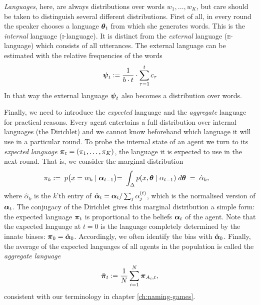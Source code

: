 \documentclass{../src/bcthesispart}
\begin{document}
\emph{Languages}, here, are always distributions over words $w_1, \dots, w_K$, but care should be taken to distinguish several different distributions.
First of all, in every round the speaker chooses a language $\boldsymbol{\mathbf{\theta}}_t$ from which she generates words.
This is the \emph{internal} language (\textsc{i}-language).
It is distinct from the \emph{external} language (\textsc{e}-language) which consists of all utterances.
The external language can be estimated with the relative frequencies of the words
\begin{equation}
	\boldsymbol{\mathbf{\psi}}_t := \frac{1}{b\cdot t}\cdot\sum_{\tau=1}^t c_\tau
\end{equation}
In that way the external language $\boldsymbol{\mathbf{\psi}}_t$ also becomes a distribution over words.




Finally, we need to introduce the \emph{expected} language and the \emph{aggregate} language for practical reasons.
Every agent entertains a full distribution over internal languages (the Dirichlet) and we cannot know beforehand which language it will use in a particular round. 
To probe the internal state of an agent we turn to its \emph{expected language} $\boldsymbol{\mathbf{\pi}}_t = (\pi_1, \dots, \pi_K)$, the language it is expected to use in the next round. 
That is, we consider the marginal distribution
\begin{align}
	\pi_k 
		&:= \; p\bigr(x = w_k \mid \boldsymbol{\mathbf{\alpha}}_{t-1}\bigl)
		=\; \int_{\Delta} 
			p(x, \boldsymbol{\mathbf{\theta}} \mid \alpha_{t-1}) 
			\; d\boldsymbol{\mathbf{\theta}}
		\;=\; \hat{\alpha}_k,
\end{align}
where $\hat{\alpha}_k$ is the $k$’th entry of $\hat{\boldsymbol{\mathbf{\alpha}}}_t= \boldsymbol{\mathbf{\alpha}}_t/\sum_j \alpha^{(t)}_j $, which is the normalised version of $\boldsymbol{\mathbf{\alpha}}_t$.
The conjugacy of the Dirichlet gives this marginal distribution a simple form: the expected language $\boldsymbol{\mathbf{\pi}}_t$ is proportional to the beliefs $\boldsymbol{\mathbf{\alpha}}_t$ of the agent. 
Note that the expected language at $t=0$ is the language completely determined by the innate biases: $\boldsymbol{\mathbf{\pi}}_0 = \hat{\boldsymbol{\mathbf{\alpha}}}_0$. 
Accordingly, we often identify the bias with $\hat{\boldsymbol{\mathbf{\alpha}}}_0$.
Finally, the average of the expected languages of all agents in the population is called the \emph{aggregate language}
\begin{align}
	\bar{\boldsymbol{\mathbf{\pi}}}_t 
		:= \frac{1}{N} \sum_{i=1}^N \boldsymbol{\mathbf{\pi}}_{A_i,t},
\end{align}
consistent with our terminology in chapter \ref{ch:naming-games}.
\end{document}
